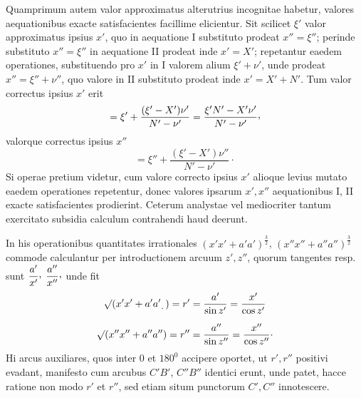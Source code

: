 Quamprimum autem valor approximatus alterutrius incognitae habetur, valores aequationibus exacte satisfacientes facillime elicientur. Sit scilicet $\xi'$ valor approximatus ipsius $x'$, quo in aequatione I substituto prodeat $x''=\xi''$; perinde substituto $x''=\xi''$ in aequatione II prodeat inde $x'=X'$; repetantur eaedem operationes, substituendo pro $x'$ in I valorem alium $\xi'+\nu'$, unde prodeat $x''=\xi''+\nu''$, quo valore in II substituto prodeat inde $x'=X'+N'$. Tum valor correctus ipsius $x'$ erit
\[
=\xi'+\frac{(\xi'-X')\nu'}{N'-\nu'}=\frac{\xi'N'-X'\nu'}{N'-\nu'}\mathpunct{\raisebox{.45ex}{,}}
\]
valorque correctus ipsius $x''$
\[
=\xi''+\frac{(\xi'-X')\nu''}{N'-\nu'}\mathpunct{\cdot}
\]
Si operae pretium videtur, cum valore correcto ipsius $x'$ alioque levius mutato eaedem operationes repetentur, donec valores ipsarum $x',x''$ aequationibus I, II exacte satisfacientes prodierint. Ceterum analystae vel mediocriter tantum exercitato subsidia calculum contrahendi haud deerunt.

In his operationibus quantitates irrationales $(x'x'+a'a')^{\frac32}$, $(x''x''+a''a'')^{\frac32}$ commode calculantur per introductionem arcuum $z',z''$, quorum tangentes resp. sunt $\dfrac{a'}{x'}\mathpunct{\raisebox{.45ex}{,}}$ $\dfrac{a''}{x''}\mathpunct{\raisebox{.45ex}{,}}$ unde fit
\[
\begin{gathered}
\surd(x'x'+a'a'\mathpunct{\raisebox{-.5ex}{.}})=r'=\frac{a'}{\sin z'}=\frac{x'}{\cos z'}\\[.6em]
\surd(x''x''+a''a'')=r''=\frac{a''}{\sin z''}=\frac{x''}{\cos z''}\mathpunct{\cdot}
\end{gathered}
\]
Hi arcus auxiliares, quos inter $0$ et $180^0$ accipere oportet, ut $r',r''$ positivi evadant, manifesto cum arcubus $C'B'$, $C''B''$ identici erunt, unde patet, hacce ratione non modo $r'$ et $r''$, sed etiam situm punctorum $C',C''$ innotescere.

